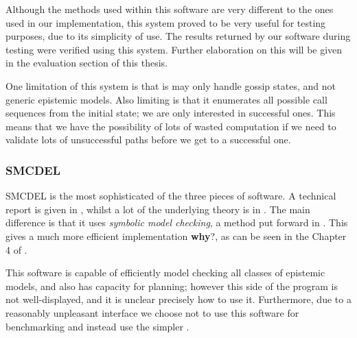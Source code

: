 \documentclass[12pt, a4paper]{article}
\begin{document}
Although the methods used within this software are very different to the ones
used in our implementation, this system proved to be very useful for testing
purposes, due to its simplicity of use. The results returned by our software
during testing were verified using this system. Further elaboration on this will
be given in the evaluation section of this thesis.

One limitation of this system is that is may only handle gossip states, and not
generic epistemic models. Also limiting is that it enumerates all possible call
sequences from the initial state; we are only interested in successful ones.
This means that we have the possibility of lots of wasted computation if we need
to validate lots of unsuccessful paths before we get to a successful one. 

\subsubsection{SMCDEL}

SMCDEL is the most sophisticated of the three pieces of software. A technical
report is given in \cite{SMCDEL}, whilst a lot of the underlying theory is in
\cite{MalvinThesis}. The main difference is that it uses \textit{symbolic model
  checking}, a method put forward in \cite{SymbolicModelChecking}. This gives a
much more efficient implementation \textbf{why}?, as can be seen in the
Chapter 4 of \cite{MalvinThesis}.

This software is capable of efficiently model checking all classes of epistemic
models, and also has capacity for planning; however this side of the program is
not well-displayed, and it is unclear precisely how to use it. Furthermore, due
to a reasonably unpleasant interface we choose not to use this software for
benchmarking and instead use the simpler \cite{GithubGossip}. 


\newpage

\printbibliography[title={Bibliography}]
\end{document}

